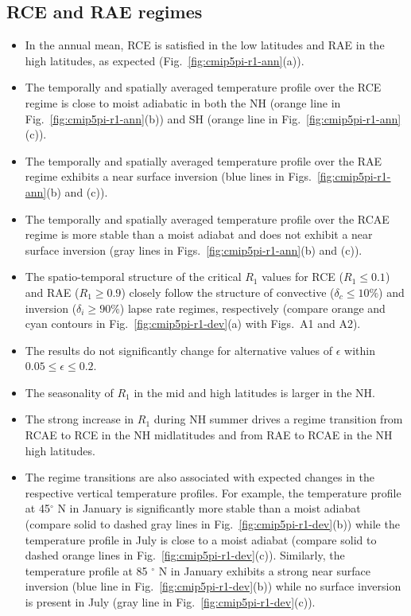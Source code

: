 \documentclass{ametsocV5}
\begin{document}
\subsection{RCE and RAE regimes}
\begin{itemize}
  \item In the annual mean, RCE is satisfied in the low latitudes and RAE in the high latitudes, as expected (Fig.~\ref{fig:cmip5pi-r1-ann}(a)).
  \item The temporally and spatially averaged temperature profile over the RCE regime is close to moist adiabatic in both the NH (orange line in Fig.~\ref{fig:cmip5pi-r1-ann}(b)) and SH (orange line in Fig.~\ref{fig:cmip5pi-r1-ann}(c)).
  \item The temporally and spatially averaged temperature profile over the RAE regime exhibits a near surface inversion (blue lines in Figs.~\ref{fig:cmip5pi-r1-ann}(b) and (c)).
  \item The temporally and spatially averaged temperature profile over the RCAE regime is more stable than a moist adiabat and does not exhibit a near surface inversion (gray lines in Figs.~\ref{fig:cmip5pi-r1-ann}(b) and (c)).
  \item The spatio-temporal structure of the critical \(R_{1}\) values for RCE (\(R_{1}\le 0.1\)) and RAE (\(R_{1}\ge 0.9\)) closely follow the structure of convective (\(\delta_{c}\le 10\%\)) and inversion (\(\delta_{i}\ge 90\%\)) lapse rate regimes, respectively (compare orange and cyan contours in Fig.~\ref{fig:cmip5pi-r1-dev}(a) with Figs.~A1 and A2).
  \item The results do not significantly change for alternative values of \(\epsilon\) within \(0.05 \le \epsilon \le 0.2\).
  \item The seasonality of \(R_{1}\) in the mid and high latitudes is larger in the NH.
  \item The strong increase in \(R_{1}\) during NH summer drives a regime transition from RCAE to RCE in the NH midlatitudes and from RAE to RCAE in the NH high latitudes.
  \item The regime transitions are also associated with expected changes in the respective vertical temperature profiles. For example, the temperature profile at 45$^{\circ}$ N in January is significantly more stable than a moist adiabat (compare solid to dashed gray lines in Fig.~\ref{fig:cmip5pi-r1-dev}(b)) while the temperature profile in July is close to a moist adiabat (compare solid to dashed orange lines in Fig.~\ref{fig:cmip5pi-r1-dev}(c)). Similarly, the temperature profile at 85 $^{\circ}$ N in January exhibits a strong near surface inversion (blue line in Fig.~\ref{fig:cmip5pi-r1-dev}(b)) while no surface inversion is present in July (gray line in Fig.~\ref{fig:cmip5pi-r1-dev}(c)).

\end{itemize}
\end{document}
